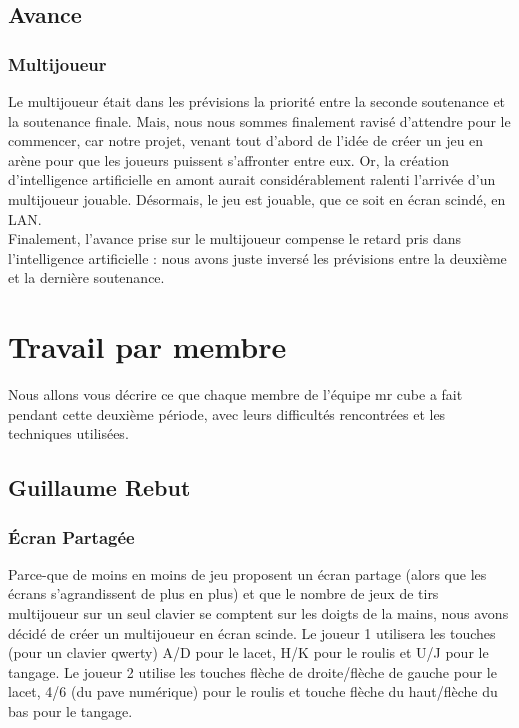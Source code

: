 \documentclass[10pt, titlepage]{report}
\begin{document}
\section{Avance}

\subsection{Multijoueur}
Le multijoueur était dans les prévisions la priorité entre la seconde soutenance et la soutenance finale. Mais, nous nous sommes finalement ravisé d'attendre pour le commencer, car notre projet, venant tout d'abord de l'idée de créer un jeu en arène pour que les joueurs puissent s'affronter entre eux. Or, la création d'intelligence artificielle en amont aurait considérablement ralenti l'arrivée d'un multijoueur jouable. Désormais, le jeu est jouable, que ce soit en écran scindé, en LAN.\\

Finalement, l'avance prise sur le multijoueur compense le retard pris dans l'intelligence artificielle : nous avons juste inversé les prévisions entre la deuxième et la dernière soutenance.

\chapter{Travail par membre}
Nous allons vous décrire ce que chaque membre de l'équipe mr cube a fait pendant cette deuxième période, avec leurs difficultés rencontrées et les techniques utilisées.

\section{Guillaume Rebut}

\subsection{Écran Partagée} 
 Parce-que de moins en moins de jeu proposent un écran partage (alors que les écrans s'agrandissent de plus en plus) et que le nombre de jeux de tirs multijoueur sur un seul clavier se comptent sur les doigts de la mains, nous avons décidé de créer un multijoueur en écran scinde.
Le joueur 1 utilisera les touches (pour un clavier qwerty) A/D pour le lacet, H/K pour le roulis et U/J pour le tangage. Le joueur 2 utilise les touches flèche de droite/flèche de gauche pour le lacet, 4/6 (du pave numérique) pour le roulis et touche flèche du haut/flèche du bas pour le tangage. \\
\end{document}

